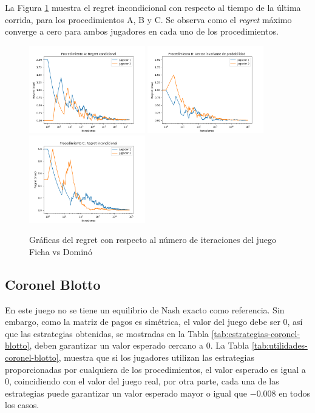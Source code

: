 La Figura \ref{fig:regret-domino} muestra el regret incondicional con respecto al tiempo de la última corrida, para los procedimientos A, B y C. Se observa como el \textit{regret} máximo converge a cero para ambos jugadores en cada uno de los procedimientos.

\begin{figure}[hbt!]
\caption{Gráficas del regret con respecto al número de iteraciones del juego Ficha vs Dominó}
\label{fig:regret-domino}
\centering
\includegraphics[width=0.45\textwidth]{graficas/domino/procedimiento-A.png}
\includegraphics[width=0.45\textwidth]{graficas/domino/procedimiento-B.png}
\includegraphics[width=0.45\textwidth]{graficas/domino/procedimiento-C.png}
\end{figure}

\subsection{Coronel Blotto}

En este juego no se tiene un equilibrio de Nash exacto como referencia. Sin embargo, como la matriz de pagos es simétrica, el valor del juego debe ser $0$, así que las estrategias obtenidas, se mostradas en la Tabla \ref{tab:estrategias-coronel-blotto}, deben garantizar un valor esperado cercano a $0$. La Tabla \ref{tab:utilidades-coronel-blotto}, muestra que si los jugadores utilizan las estrategias proporcionadas por cualquiera de los procedimientos, el valor esperado es igual a $0$, coincidiendo con el valor del juego real, por otra parte, cada una de las estrategias puede garantizar un valor esperado mayor o igual que $-0.008$ en todos los casos.

